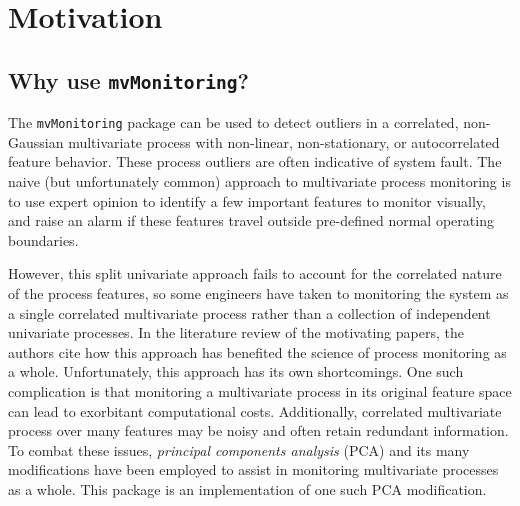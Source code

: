 \documentclass{report}\usepackage[]{graphicx}\usepackage[]{color}
\begin{document}

\section{Motivation} \label{sec:D_Motivation}

\subsection{Why use \texttt{mvMonitoring}?}
The \texttt{mvMonitoring} package can be used to detect outliers in a correlated, non-Gaussian multivariate process with non-linear, non-stationary, or autocorrelated feature behavior. These process outliers are often indicative of system fault. The naive (but unfortunately common) approach to multivariate process monitoring is to use expert opinion to identify a few important features to monitor visually, and raise an alarm if these features travel outside pre-defined normal operating boundaries.

However, this split univariate approach fails to account for the correlated nature of the process features, so some engineers have taken to monitoring the system as a single correlated multivariate process rather than a collection of independent univariate processes. In the literature review of the motivating papers, the authors cite how this approach has benefited the science of process monitoring as a whole. Unfortunately, this approach has its own shortcomings. One such complication is that monitoring a multivariate process in its original feature space can lead to exorbitant computational costs. Additionally, correlated multivariate process over many features may be noisy and often retain redundant information. To combat these issues, \emph{principal components analysis} (PCA) and its many modifications have been employed to assist in monitoring multivariate processes as a whole. This package is an implementation of one such PCA modification.
\end{document}
